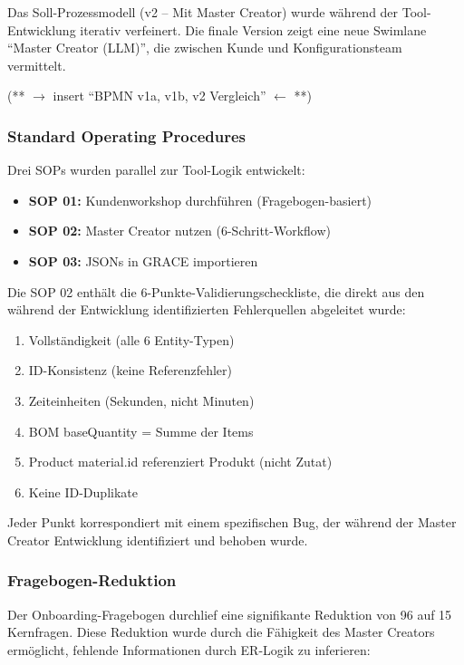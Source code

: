Das Soll-Prozessmodell (v2 -- Mit Master Creator) wurde während der Tool-Entwicklung iterativ verfeinert. Die finale Version zeigt eine neue Swimlane ``Master Creator (LLM)'', die zwischen Kunde und Konfigurationsteam vermittelt.

(** $\rightarrow$ insert ``BPMN v1a, v1b, v2 Vergleich'' $\leftarrow$ **)


\subsubsection{Standard Operating Procedures}
\label{subsubsec:SOPs}

Drei SOPs wurden parallel zur Tool-Logik entwickelt:

\begin{itemize}
    \item \textbf{SOP 01:} Kundenworkshop durchführen (Fragebogen-basiert)
    \item \textbf{SOP 02:} Master Creator nutzen (6-Schritt-Workflow)
    \item \textbf{SOP 03:} JSONs in GRACE importieren
\end{itemize}

Die SOP 02 enthält die 6-Punkte-Validierungscheckliste, die direkt aus den während der Entwicklung identifizierten Fehlerquellen abgeleitet wurde:

\begin{enumerate}
    \item Vollständigkeit (alle 6 Entity-Typen)
    \item ID-Konsistenz (keine Referenzfehler)
    \item Zeiteinheiten (Sekunden, nicht Minuten)
    \item BOM baseQuantity = Summe der Items
    \item Product material.id referenziert Produkt (nicht Zutat)
    \item Keine ID-Duplikate
\end{enumerate}

Jeder Punkt korrespondiert mit einem spezifischen Bug, der während der Master Creator Entwicklung identifiziert und behoben wurde.


\subsubsection{Fragebogen-Reduktion}
\label{subsubsec:FragebogenReduktion}

Der Onboarding-Fragebogen durchlief eine signifikante Reduktion von 96 auf 15 Kernfragen. Diese Reduktion wurde durch die Fähigkeit des Master Creators ermöglicht, fehlende Informationen durch ER-Logik zu inferieren:

